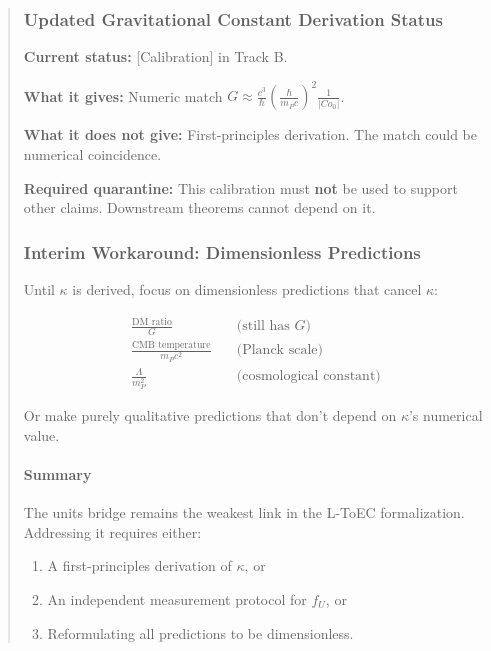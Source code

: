 \documentclass[11pt,titlepage]{article}
\begin{document}
\begin{abstract}
\subsubsection{Updated Gravitational Constant Derivation Status}

\begin{tcolorbox}[colback=blue!5!white,colframe=blue!75!black,title=Status: $G$ from $|Co_0|$]
\textbf{Current status:} [Calibration] in Track B.

\textbf{What it gives:} Numeric match $G \approx \frac{c^3}{\hbar} \left(\frac{\hbar}{m_P c}\right)^2 \frac{1}{|Co_0|}$.

\textbf{What it does not give:} First-principles derivation. The match could be numerical coincidence.

\textbf{Required quarantine:} This calibration must \textbf{not} be used to support other claims. Downstream theorems cannot depend on it.
\end{tcolorbox}

\subsubsection{Interim Workaround: Dimensionless Predictions}
Until $\kappa$ is derived, focus on dimensionless predictions that cancel $\kappa$:

\begin{align*}
\frac{\text{DM ratio}}{G} &\quad\text{(still has $G$)} \\
\frac{\text{CMB temperature}}{m_P c^2} &\quad\text{(Planck scale)} \\
\frac{\Lambda}{m_P^2} &\quad\text{(cosmological constant)}
\end{align*}

Or make purely qualitative predictions that don't depend on $\kappa$'s numerical value.

\paragraph{Summary}
The units bridge remains the weakest link in the L-ToEC formalization. Addressing it requires either:
\begin{enumerate}
\item A first-principles derivation of $\kappa$, or
\item An independent measurement protocol for $f_U$, or
\item Reformulating all predictions to be dimensionless.
\end{enumerate}


\end{abstract}
\end{document}
